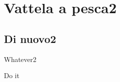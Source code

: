 \section{Vattela a pesca2}

\subsection{ Di nuovo2}

\begin{frame}[fragile]{Whatever2}

  Do it 

\end{frame}
